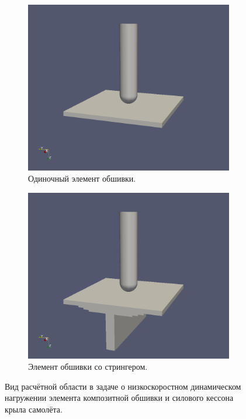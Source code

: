 \begin{figure}[htp]
\centering
\begin{subfigure}[b]{0.45\textwidth}
\centering
\includegraphics[width=\textwidth]{png/pkm-experiment/wing-only/scene.png}
\caption{Одиночный элемент обшивки.}
\end{subfigure}
\begin{subfigure}[b]{0.45\textwidth}
\centering
\includegraphics[width=\textwidth]{png/pkm-experiment/wing-stringer/scene.png}
\caption{Элемент обшивки со стрингером.}
\end{subfigure}
\caption{Вид расчётной области в задаче о низкоскоростном динамическом нагружении элемента композитной обшивки и силового кессона крыла самолёта.}
\label{pic:pkm_problem}
\end{figure}

